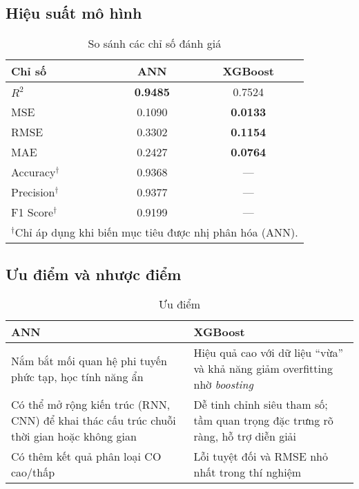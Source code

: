 \subsection{Hiệu suất mô hình}

\begin{table}[H]
\centering
\caption{So sánh các chỉ số đánh giá}
\begin{tabular}{l|c|c}
\toprule
\textbf{Chỉ số} & \textbf{ANN} & \textbf{XGBoost} \\
\midrule
$R^{2}$ & \textbf{0.9485} & 0.7524 \\
\midrule
MSE & 0.1090 & \textbf{0.0133} \\
\midrule
RMSE & 0.3302 & \textbf{0.1154} \\
\midrule
MAE & 0.2427 & \textbf{0.0764} \\
\midrule
Accuracy$^{\dagger}$ & 0.9368 & — \\
\midrule
Precision$^{\dagger}$ & 0.9377 & — \\
\midrule
F1 Score$^{\dagger}$ & 0.9199 & — \\
\bottomrule
\multicolumn{3}{l}{$^{\dagger}$Chỉ áp dụng khi biến mục tiêu được nhị phân hóa (ANN).}
\end{tabular}
\end{table}
\newpage

\subsection{Ưu điểm và nhược điểm}

\begin{table}[h]
\centering
\caption{Ưu điểm}
\begin{tabular}{p{7cm}|p{7cm}}
\toprule
\textbf{ANN} & \textbf{XGBoost} \\
\midrule
Nắm bắt mối quan hệ phi tuyến phức tạp, học tính năng ẩn & Hiệu quả cao với dữ liệu “vừa” và khả năng giảm overfitting nhờ \emph{boosting} \\
\midrule
Có thể mở rộng kiến trúc (RNN, CNN) để khai thác cấu trúc chuỗi thời gian hoặc không gian & Dễ tinh chỉnh siêu tham số; tầm quan trọng đặc trưng rõ ràng, hỗ trợ diễn giải \\
\midrule
Có thêm kết quả phân loại CO cao/thấp & Lỗi tuyệt đối và RMSE nhỏ nhất trong thí nghiệm \\
\bottomrule
\end{tabular}
\end{table}

